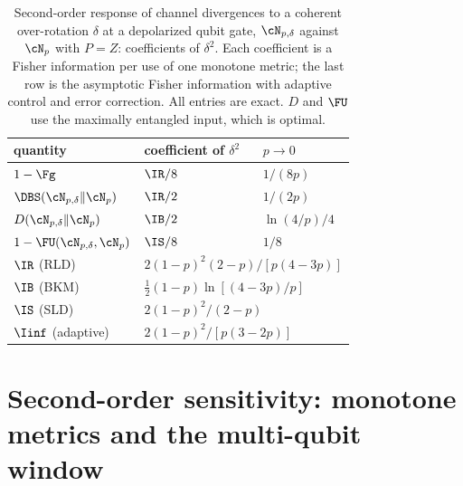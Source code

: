 \begin{table}[!tbp]
\centering
\caption{Second-order response of channel divergences to a coherent over-rotation $\delta$ at a depolarized qubit gate, $\cN_{p,\delta}$ against $\cN_p$ with $P=Z$: coefficients of $\delta^2$. Each coefficient is a Fisher information per use of one monotone metric; the last row is the asymptotic Fisher information with adaptive control and error correction. All entries are exact. $D$ and $\FU$ use the maximally entangled input, which is optimal.}
\label{gate:tab:hier}
\begin{tabular}{lll}
\toprule
quantity & coefficient of $\delta^2$ & $p\to0$\\
\midrule
$1-\Fg$ & $\IR/8$ & $1/(8p)$\\
$\DBS(\cN_{p,\delta}\|\cN_p)$ & $\IR/2$ & $1/(2p)$\\
$D(\cN_{p,\delta}\|\cN_p)$ & $\IB/2$ & $\ln(4/p)/4$\\
$1-\FU(\cN_{p,\delta},\cN_p)$ & $\IS/8$ & $1/8$\\
\midrule
$\IR$ (RLD) & \multicolumn{2}{l}{$2(1-p)^2(2-p)/[p(4-3p)]$}\\
$\IB$ (BKM) & \multicolumn{2}{l}{$\frac12(1-p)\ln[(4-3p)/p]$}\\
$\IS$ (SLD) & \multicolumn{2}{l}{$2(1-p)^2/(2-p)$}\\
$\Iinf$ (adaptive) & \multicolumn{2}{l}{$2(1-p)^2/[p(3-2p)]$}\\
\bottomrule
\end{tabular}
\end{table}

\section{Second-order sensitivity: monotone metrics and the multi-qubit window}\label{gate:sec:second}

